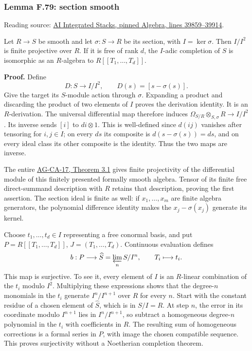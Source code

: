 \documentclass[11pt,a4paper,openany]{report}
\begin{document}
\label{AG-RG-S05-algebra-lemma-section-smooth}

\subsubsection{Lemma F.79: section smooth}\label{AG-RG-S05-lemma-f.79-section-smooth}

Reading source: \href{https://github.com/KokunoYumeto/unofficial-stacks-project-ai-drafts/blob/565b10e987aba5969b21145a0833f42d69f96790/algebra.tex\#L39859-L39914}{AI Integrated Stacks, pinned Algebra, lines 39859--39914}.

Let \(R\to S\) be smooth and let \(\sigma:S\to R\) be its section, with \(I=\ker\sigma\). Then \(I/I^2\) is finite projective over \(R\). If it is free of rank \(d\), the \(I\)-adic completion of \(S\) is isomorphic as an \(R\)-algebra to \(R[[T_1,\ldots,T_d]]\).

\textbf{Proof.} Define \[D:S\longrightarrow I/I^2,\qquad
D(s)=[s-\sigma(s)].\] Give the target its \(S\)-module action through \(\sigma\). Expanding a product and discarding the product of two elements of \(I\) proves the derivation identity. It is an \(R\)-derivation. The universal differential map therefore induces \(\Omega_{S/R}\otimes_{S,\sigma}R\to I/I^2\). Its inverse sends \([i]\) to \(di\otimes1\). This is well-defined since \(d(ij)\) vanishes after tensoring for \(i,j\in I\); on every \(ds\) its composite is \(d(s-\sigma(s))=ds\), and on every ideal class its other composite is the identity. Thus the two maps are inverse.

The entire \href{https://github.com/KokunoYumeto/open-math-courses/blob/d02d0a3669f42579db037cd44de1d113fdd770a1/docs/courses/AG-CA/src/formally-smooth-unramified-and-etale-ring-maps.md}{AG-CA-17, Theorem 3.1} gives finite projectivity of the differential module of this finitely presented formally smooth algebra. Tensor of its finite free direct-summand description with \(R\) retains that description, proving the first assertion. The section ideal is finite as well: if \(x_1,\ldots,x_m\) are finite algebra generators, the polynomial difference identity makes the \(x_j-\sigma(x_j)\) generate its kernel.

Choose \(t_1,\ldots,t_d\in I\) representing a free conormal basis, and put \(P=R[[T_1,\ldots,T_d]]\), \(J=(T_1,\ldots,T_d)\). Continuous evaluation defines \[b:P\longrightarrow\widehat S=\varprojlim_n S/I^n,\qquad T_i\longmapsto t_i.\] This map is surjective. To see it, every element of \(I\) is an \(R\)-linear combination of the \(t_i\) modulo \(I^2\). Multiplying these expressions shows that the degree-\(n\) monomials in the \(t_i\) generate \(I^n/I^{n+1}\) over \(R\) for every \(n\). Start with the constant residue of a chosen element of \(\widehat S\), which is in \(S/I=R\). At step \(n\), the error in its coordinate modulo \(I^{n+1}\) lies in \(I^n/I^{n+1}\), so subtract a homogeneous degree-\(n\) polynomial in the \(t_i\) with coefficients in \(R\). The resulting sum of homogeneous corrections is a formal series in \(P\), with image the chosen compatible sequence. This proves surjectivity without a Noetherian completion theorem.
\end{document}
